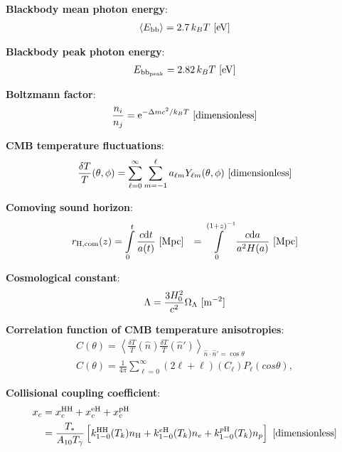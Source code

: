 \documentclass[a4paper,11pt]{article}
\begin{document}
{\noindent}\textbf{Blackbody mean photon energy}:
\begin{align*}
    \langle E_\mathrm{bb} \rangle = 2.7\,k_BT  ~ [{\rm eV}]
\end{align*}

{\noindent}\textbf{Blackbody peak photon energy}:
\begin{align*}
    E_\mathrm{bb_{peak}} = 2.82\,k_BT ~ [{\rm eV}]
\end{align*}

{\noindent}\textbf{Boltzmann factor}:
\begin{align*}
    \frac{n_i}{n_j} = \mathrm{e}^{-\Delta mc^2/k_BT} ~ [{\rm dimensionless}]
\end{align*}

{\noindent}\textbf{CMB temperature fluctuations}:
\begin{align*}
    \frac{\delta T}{T}(\theta,\phi) = \sum\limits_{\ell=0}^{\infty}\sum\limits_{m=-1}^{\ell} a_{\ell m}Y_{\ell m}(\theta,\phi) ~ [{\rm dimensionless}]
\end{align*}

{\noindent}\textbf{Comoving sound horizon}:
\begin{align*}
    r_\mathrm{H,com}(z) &= \int\limits_0^t \frac{c\mathrm{d}t}{a(t)} ~ [{\rm Mpc}]
    &= \int\limits_0^{(1+z)^{-1}} \frac{c\mathrm{d}a}{a^2H(a)} ~ [{\rm Mpc}]
\end{align*}

{\noindent}\textbf{Cosmological constant}:
\begin{align*}
    \Lambda = \frac{3H_0^2}{c^2}\Omega_\Lambda ~ [{\rm m^{-2}}]
\end{align*}

{\noindent}\textbf{Correlation function of CMB temperature anisotropies}:
\begin{align*}
    C(\theta) = \left\langle\frac{\delta T}{T}(\hat{n})\frac{\delta T}{T}(\hat{n}')\right\rangle_{\hat{n}\cdot\hat{n}'=\cos\theta} \\
    C(\theta) = \frac{1}{4\pi} \sum\limits_{\ell=0}^\infty (2\ell+\ell)(C_\ell)P_\ell(cos\theta),
\end{align*}

{\noindent}\textbf{Collisional coupling coefficient}:
\begin{align*}
    x_c &= x_c^\mathrm{HH} + x_c^\mathrm{eH} + x_c^\mathrm{pH} \\
        &= \frac{T_*}{A_{10}T_\gamma} \left[k_{1-0}^\mathrm{HH}(T_k)n_\mathrm{H}+k_{1-0}^{e\mathrm{H}}(T_k)n_e+k_{1-0}^{p\mathrm{H}}(T_k)n_p\right] ~ [{\rm dimensionless}]
\end{align*}
\end{document}
